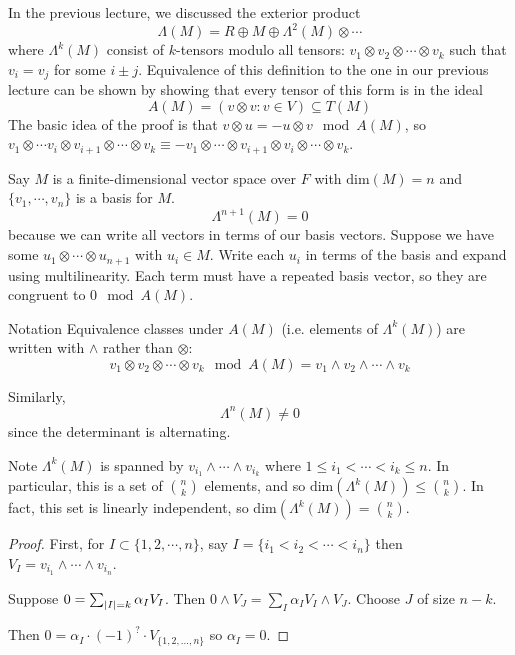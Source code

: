 \documentclass[a4paper,twoside,master.tex]{subfiles}
\begin{document}

In the previous lecture, we discussed the exterior product
\begin{equation}
    \Lambda(M) = R \oplus M \oplus \Lambda^2(M) \otimes \cdots
\end{equation}
where $ \Lambda^k(M) $ consist of $ k $-tensors modulo all tensors: $ v_1 \otimes v_2 \otimes \cdots \otimes v_k $ such that $ v_i = v_j $ for some $ i \pm j $. Equivalence of this definition to the one in our previous lecture can be shown by showing that every tensor of this form is in the ideal
\begin{equation}
    A(M) = (v \otimes v \colon v \in V) \subseteq T(M)
\end{equation}
The basic idea of the proof is that $ v \otimes u = - u \otimes v \mod A(M) $, so $ v_1 \otimes \cdots v_i \otimes v_{i+1} \otimes \cdots \otimes v_k \equiv - v_1 \otimes \cdots \otimes v_{i+1} \otimes v_i \otimes \cdots \otimes v_k $.

Say $ M $ is a finite-dimensional vector space over $ F $ with $ \text{dim}(M) = n $ and $ \{v_1, \cdots, v_n\} $ is a basis for $ M $.
\begin{equation}
    \Lambda^{n+1}(M) = 0
\end{equation}
because we can write all vectors in terms of our basis vectors. Suppose we have some $ u_1 \otimes \cdots \otimes u_{n+1} $ with $ u_i \in M $. Write each $ u_i $ in terms of the basis and expand using multilinearity. Each term must have a repeated basis vector, so they are congruent to $ 0 \mod A(M) $.
\begin{note}{Notation}
    Equivalence classes under $ A(M) $ (i.e. elements of $ \Lambda^k(M) $) are written with $ \wedge $ rather than $ \otimes $:
    \begin{equation}
        v_1 \otimes v_2 \otimes \cdots \otimes v_k \mod A(M) = v_1 \wedge v_2 \wedge \cdots \wedge v_k
    \end{equation}
\end{note}
Similarly,
\begin{equation}
    \Lambda^n(M) \neq 0
\end{equation}
since the determinant is alternating.

Note $ \Lambda^k(M) $ is spanned by $ v_{i_1} \wedge \cdots \wedge v_{i_k} $ where $ 1 \leq i_1 < \cdots < i_k \leq n $. In particular, this is a set of $ \binom{n}{k} $ elements, and so $ \text{dim}(\Lambda^k(M)) \leq \binom{n}{k} $. In fact, this set is linearly independent, so $ \text{dim}(\Lambda^k(M)) = \binom{n}{k} $.
\begin{proof}
    First, for $ I \subset \{1,2,\cdots,n\} $, say $ I = \{i_1 < i_2 < \cdots < i_n\} $ then $ V_I = v_{i_1} \wedge \cdots \wedge v_{i_n} $.

    Suppose $ 0 = \sum_{\abs{I} = k} \alpha_I V_I $. Then $ 0 \wedge V_J = \sum_I \alpha_I V_I \wedge V_J $. Choose $ J $ of size $ n-k $.

    Then $ 0 = \alpha_I \cdot (-1)^{?} \cdot V_{\{1,2,\ldots,n\}} $ so $ \alpha_I = 0 $.
\end{proof}
\end{document}
